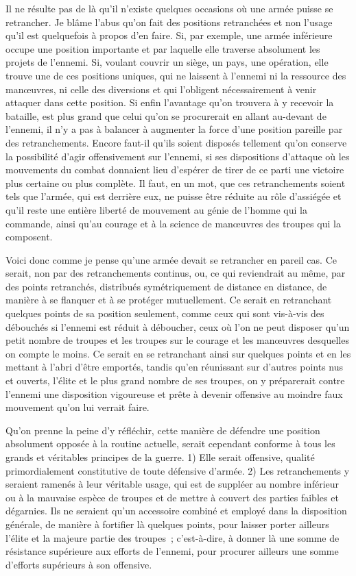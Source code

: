 \documentclass[french,twoside]{book} %
\begin{document}
Il ne résulte pas de là qu’il n’existe quelques occasions où une armée puisse se retrancher. Je blâme l’abus qu’on fait des positions retranchées et non l’usage qu’il est quelquefois à propos d’en faire. Si, par exemple, une armée inférieure occupe une position importante et par laquelle elle traverse absolument les projets de l’ennemi. Si, voulant couvrir un siège, un pays, une opération, elle trouve une de ces positions uniques, qui ne laissent à l’ennemi ni la ressource des manœuvres, ni celle des diversions et qui l’obligent nécessairement à venir attaquer dans cette position. Si enfin l’avantage qu’on trouvera à y recevoir la bataille, est plus grand que celui qu’on se procurerait en allant au-devant de l’ennemi, il n’y a pas à balancer à augmenter la force d’une position pareille par des retranchements. Encore faut-il qu’ils soient disposés tellement qu’on conserve la possibilité d’agir offensivement sur l’ennemi, si ses dispositions d’attaque où les mouvements du combat donnaient lieu d’espérer de tirer de ce parti une victoire plus certaine ou plus complète. Il faut, en un mot, que ces retranchements soient tels que l’armée, qui est derrière eux, ne puisse être réduite au rôle d’assiégée et qu’il reste une entière liberté de mouvement au génie de l’homme qui la commande, ainsi qu’au courage et à la science de manœuvres des troupes qui la composent.\par
Voici donc comme je pense qu’une armée devait se retrancher en pareil cas. Ce serait, non par des retranchements continus, ou, ce qui reviendrait au même, par des points retranchés, distribués symétriquement de distance en distance, de manière à se flanquer et à se protéger mutuellement. Ce serait en retranchant quelques points de sa position seulement, comme ceux qui sont vis-à-vis des débouchés si l’ennemi est réduit à déboucher, ceux où l’on ne peut disposer qu’un petit nombre de troupes et les troupes sur le courage et les manœuvres desquelles on compte le moins. Ce serait en se retranchant ainsi sur quelques points et en les mettant à l’abri d’être emportés, tandis qu’en réunissant sur d’autres points nus et ouverts, l’élite et le plus grand nombre de ses troupes, on y préparerait contre l’ennemi une disposition vigoureuse et prête à devenir offensive au moindre faux mouvement qu’on lui verrait faire.\par
Qu’on prenne la peine d’y réfléchir, cette manière de défendre une position absolument opposée à la routine actuelle, serait cependant conforme à tous les grands et véritables principes de la guerre. 1) Elle serait offensive, qualité primordialement constitutive de toute défensive d’armée. 2) Les retranchements y seraient ramenés à leur véritable usage, qui est de suppléer au nombre inférieur ou à la mauvaise espèce de troupes et de mettre à couvert des parties faibles et dégarnies. Ils ne seraient qu’un accessoire combiné et employé dans la disposition générale, de manière à fortifier là quelques points, pour laisser porter ailleurs l’élite et la majeure partie des troupes ; c’est-à-dire, à donner là une somme de résistance supérieure aux efforts de l’ennemi, pour procurer ailleurs une somme d’efforts supérieurs à son offensive.\par
\end{document}

